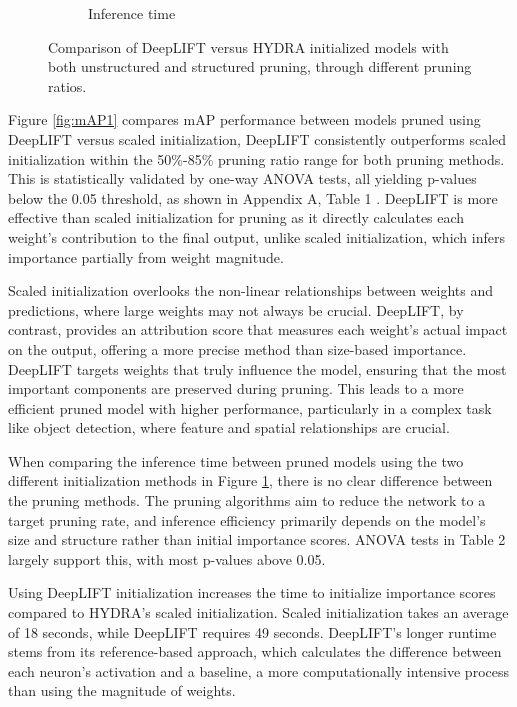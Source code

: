 \documentclass[10pt]{cai}
\begin{document}
\begin{figure}
\begin{subfigure}[b]{.45\textwidth}
      \caption{Inference time}
      \label{fig:time1}
    \end{subfigure}
    \caption{Comparison of DeepLIFT versus HYDRA initialized models with both unstructured and structured pruning, through different pruning ratios.}
    \label{fig:result1}
\end{figure}

Figure \ref{fig:mAP1} compares mAP performance between models pruned using DeepLIFT versus scaled initialization, DeepLIFT consistently outperforms scaled initialization within the 50\%-85\% pruning ratio range for both pruning methods. This is statistically validated by one-way ANOVA tests, all yielding p-values below the 0.05 threshold, as shown in Appendix A, Table 1 \cite{MyAppendix}. DeepLIFT is more effective than scaled initialization for pruning as it directly calculates each weight's contribution to the final output, unlike scaled initialization, which infers importance partially from weight magnitude.

Scaled initialization overlooks the non-linear relationships between weights and predictions, where large weights may not always be crucial. DeepLIFT, by contrast, provides an attribution score that measures each weight's actual impact on the output, offering a more precise method than size-based importance. DeepLIFT targets weights that truly influence the model, ensuring that the most important components are preserved during pruning. This leads to a more efficient pruned model with higher performance, particularly in a complex task like object detection, where feature and spatial relationships are crucial.

When comparing the inference time between pruned models using the two different initialization methods in Figure \ref{fig:time1}, there is no clear difference between the pruning methods. The pruning algorithms aim to reduce the network to a target pruning rate, and inference efficiency primarily depends on the model’s size and structure rather than initial importance scores. ANOVA tests in Table 2 \cite{MyAppendix} largely support this, with most p-values above 0.05. 

Using DeepLIFT initialization increases the time to initialize importance scores compared to HYDRA's scaled initialization. Scaled initialization takes an average of 18 seconds, while DeepLIFT requires 49 seconds. DeepLIFT's longer runtime stems from its reference-based approach, which calculates the difference between each neuron's activation and a baseline, a more computationally intensive process than using the magnitude of weights.
\end{document}
